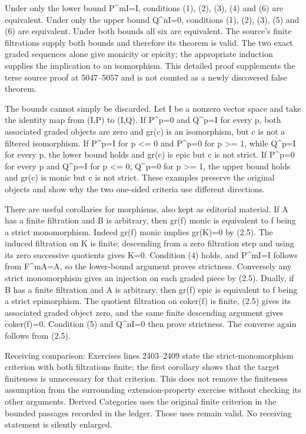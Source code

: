 \documentclass[11pt]{article}
\begin{document}
Under only the lower bound P\^{}mI=I, conditions (1), (2), (3), (4) and (6) are equivalent. Under only the upper bound Q\^{}nI=0, conditions (1), (2), (3), (5) and (6) are equivalent. Under both bounds all six are equivalent. The source's finite filtrations supply both bounds and therefore its theorem is valid. The two exact graded sequences alone give monicity or epicity; the appropriate induction supplies the implication to an isomorphism. This detailed proof supplements the terse source proof at 5047--5057 and is not counted as a newly discovered false theorem.

The bounds cannot simply be discarded. Let I be a nonzero vector space and take the identity map from (I,P) to (I,Q). If P\^{}p=0 and Q\^{}p=I for every p, both associated graded objects are zero and gr(c) is an isomorphism, but c is not a filtered isomorphism. If P\^{}p=I for p \textless= 0 and P\^{}p=0 for p \textgreater= 1, while Q\^{}p=I for every p, the lower bound holds and gr(c) is epic but c is not strict. If P\^{}p=0 for every p and Q\^{}p=I for p \textless= 0, Q\^{}p=0 for p \textgreater= 1, the upper bound holds and gr(c) is monic but c is not strict. These examples preserve the original objects and show why the two one-sided criteria use different directions.

There are useful corollaries for morphisms, also kept as editorial material. If A has a finite filtration and B is arbitrary, then gr(f) monic is equivalent to f being a strict monomorphism. Indeed gr(f) monic implies gr(K)=0 by (2.5). The induced filtration on K is finite; descending from a zero filtration step and using its zero successive quotients gives K=0. Condition (4) holds, and P\^{}mI=I follows from F\^{}mA=A, so the lower-bound argument proves strictness. Conversely any strict monomorphism gives an injection on each graded piece by (2.5). Dually, if B has a finite filtration and A is arbitrary, then gr(f) epic is equivalent to f being a strict epimorphism. The quotient filtration on coker(f) is finite, (2.5) gives its associated graded object zero, and the same finite descending argument gives coker(f)=0. Condition (5) and Q\^{}nI=0 then prove strictness. The converse again follows from (2.5).

Receiving comparison: Exercises lines 2403--2409 state the strict-monomorphism criterion with both filtrations finite; the first corollary shows that the target finiteness is unnecessary for that criterion. This does not remove the finiteness assumption from the surrounding extension-property exercise without checking its other arguments. Derived Categories uses the original finite criterion in the bounded passages recorded in the ledger. Those uses remain valid. No receiving statement is silently enlarged.
\end{document}
